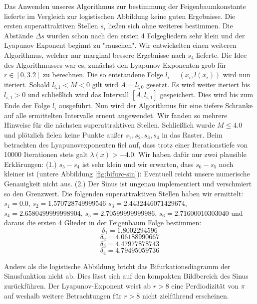 \documentclass[12pt,a4paper]{article}
\begin{document}
Das Anwenden unseres Algorithmus zur bestimmung der Feigenbaumkonstante lieferte im Vergleich zur logistischen Abbildung keine guten Ergebnisse. Die ersten superattraktiven Stellen $s_i$ ließen sich ohne weiteres bestimmen. Die Abstände $\Delta s$ wurden schon nach den ersten 4 Folgegliedern sehr klein und der Lyapunov Exponent beginnt zu "rauschen". 
Wir entwickelten einen weiteren Algorithmus, welcher nur marginal bessere Ergebnisse nach $s_4$ lieferte. Die Idee des Algorithmusses war es, zunächst den Lyapunov Exponenten grob für $r\in [0,3.2]$ zu berechnen. 
Die so entstandene Folge $l_i=(x_i, l(x_i))$ wird nun iteriert. Sobald $l_{i,1} < M < 0$ gilt wird $A=l_{i,0}$ gesetzt. Es wird weiter iteriert bis $l_{i,1} > 0$ und schließlich wird das Intervall $[A, l_{i,1}]$ gespeichert. Dies wird bis zum Ende der Folge $l_i$ ausgeführt. 
Nun wird der Algorithmus für eine tiefere Schranke auf alle ermittelten Intervalle erneut angewendet. 
Wir fanden so mehrere Hinweise für die nächsten superattraktiven Stellen. 
Schließlich wurde $M \leq 4.0$ und plötzlich fielen keine Punkte außer $s_1, s_2, s_3, s_4$ in das Raster. Beim betrachten des Lyapunovexponenten fiel auf, dass trotz einer Iterationstiefe von 10000 Iterationen stets galt $\lambda(x)>-4.0$. 
Wir haben dafür nur zwei plausible Erklärungen: 
(1.) $s_5-s_4$ ist sehr klein und wir erwarten, dass $s_6-s_5$ noch kleiner ist (untere Abbildung \ref{fig:bifurc-sin}): Eventuell reicht unsere numerische Genauigkeit nicht aus. 
(2.) Der Sinus ist ungenau implementiert und verschmiert so den Grenzwert. 
Die folgenden superattraktiven Stellen haben wir ermittelt: $s_1=0.0$, $s_2=1.570728749999546$ $s_3=2.4432446071429674$, $s_4=2.6580499999998904$, $s_5=2.70599999999986$, $s_6=2.71600010303040$ und daraus die ersten 4 Glieder in der Feigenbaum Folge bestimmen:
$$\delta_1=1.8002294596$$
$$\delta_2=4.06188990667$$
$$\delta_3=4.47977878743$$
$$\delta_4=4.79495059736$$

Anders als die logistische Abbildung bricht das Bifurkationsdiagramm der Sinusfunktion nicht ab. Dies lässt sich auf den kompakten Bildbereich des Sinus zurückführen. Der Lyapunov-Exponent weist ab $r>8$ eine Perdiodizität von $\pi$ auf weshalb weitere Betrachtungen für $r>8$ nicht zielführend erscheinen.
\end{document}
